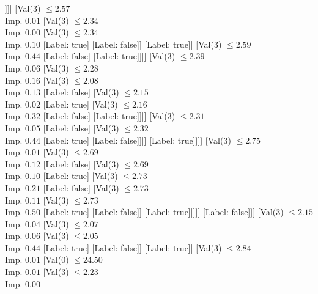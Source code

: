 \documentclass[margin=10pt]{standalone}
\begin{document}
\begin{forest}
												]]]
									[Val($3$) $ \leq 2.57$ \\ Imp. $0.01$
										[Val($3$) $ \leq 2.34$ \\ Imp. $0.00$
											[Val($3$) $ \leq 2.34$ \\ Imp. $0.10$
												[Label: true]
												[Label: false]]
											[Label: true]]
										[Val($3$) $ \leq 2.59$ \\ Imp. $0.44$
											[Label: false]
											[Label: true]]]]
								[Val($3$) $ \leq 2.39$ \\ Imp. $0.06$
									[Val($3$) $ \leq 2.28$ \\ Imp. $0.16$
										[Val($3$) $ \leq 2.08$ \\ Imp. $0.13$
											[Label: false]
											[Val($3$) $ \leq 2.15$ \\ Imp. $0.02$
												[Label: true]
												[Val($3$) $ \leq 2.16$ \\ Imp. $0.32$
													[Label: false]
													[Label: true]]]]
										[Val($3$) $ \leq 2.31$ \\ Imp. $0.05$
											[Label: false]
											[Val($3$) $ \leq 2.32$ \\ Imp. $0.44$
												[Label: true]
												[Label: false]]]]
									[Label: true]]]]
						[Val($3$) $ \leq 2.75$ \\ Imp. $0.01$
							[Val($3$) $ \leq 2.69$ \\ Imp. $0.12$
								[Label: false]
								[Val($3$) $ \leq 2.69$ \\ Imp. $0.10$
									[Label: true]
									[Val($3$) $ \leq 2.73$ \\ Imp. $0.21$
										[Label: false]
										[Val($3$) $ \leq 2.73$ \\ Imp. $0.11$
											[Val($3$) $ \leq 2.73$ \\ Imp. $0.50$
												[Label: true]
												[Label: false]]
											[Label: true]]]]]
							[Label: false]]]
					[Val($3$) $ \leq 2.15$ \\ Imp. $0.04$
						[Val($3$) $ \leq 2.07$ \\ Imp. $0.06$
							[Val($3$) $ \leq 2.05$ \\ Imp. $0.44$
								[Label: true]
								[Label: false]]
							[Label: true]]
						[Val($3$) $ \leq 2.84$ \\ Imp. $0.01$
							[Val($0$) $ \leq 24.50$ \\ Imp. $0.01$
								[Val($3$) $ \leq 2.23$ \\ Imp. $0.00$

\end{forest}
\end{document}
